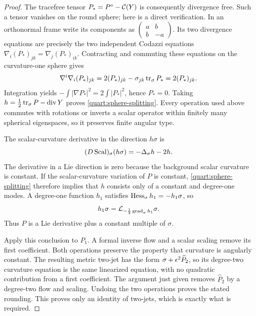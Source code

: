 \begin{proof}
The tracefree tensor \(P_*=P^{\circ}-\mathcal C(Y)\) is consequently
divergence free.  Such a tensor vanishes on the round sphere; here is
a direct verification.  In an orthonormal frame write its components
as
\(\left(\begin{smallmatrix}a&b\\b&-a\end{smallmatrix}\right)\).
Its two divergence equations are precisely the two independent
Codazzi equations
\(\nabla_i(P_*)_{jk}=\nabla_j(P_*)_{ik}\).
Contracting and commuting these equations on the curvature-one sphere
gives
\[
 \nabla^i\nabla_i(P_*)_{jk}
      =2(P_*)_{jk}-\sigma_{jk}\operatorname{tr}_\sigma P_*
      =2(P_*)_{jk}.
\]
Integration yields
\(-\int|\nabla P_*|^2=2\int|P_*|^2\), hence \(P_*=0\).
Taking
\(h=\frac12\operatorname{tr}_\sigma P-\operatorname{div} Y\) proves
\eqref{quart:sphere-splitting}.  Every operation used above commutes
with rotations or inverts a scalar operator within finitely many
spherical eigenspaces, so it preserves finite angular type.

The scalar-curvature derivative in the direction \(h\sigma\) is
\[
 (D\operatorname{Scal})_\sigma(h\sigma)=-\Delta_\sigma h-2h.
\]
The derivative in a Lie direction is zero because the background
scalar curvature is constant.  If the scalar-curvature variation of
\(P\) is constant, \eqref{quart:sphere-splitting} therefore implies
that \(h\) consists only of a constant and degree-one modes.  A
degree-one function \(h_1\) satisfies
\(\operatorname{Hess}_\sigma h_1=-h_1\sigma\), so
\[
 h_1\sigma
   =\mathcal L_{-\frac12\operatorname{grad}_\sigma h_1}\sigma.
\]
Thus \(P\) is a Lie derivative plus a constant multiple of \(\sigma\).

Apply this conclusion to \(P_1\).  A formal inverse flow and a scalar
scaling remove its first coefficient.  Both operations preserve
the property that curvature is angularly constant.  The resulting
metric two-jet has the form \(\sigma+\epsilon^2\widehat P_2\), so its
degree-two curvature equation is the same linearized equation, with
no quadratic contribution from a first coefficient.  The argument
just given removes \(\widehat P_2\) by a degree-two flow and scaling.
Undoing the two operations proves the stated rounding.  This proves
only an identity of two-jets, which is exactly what is required.
\end{proof}

